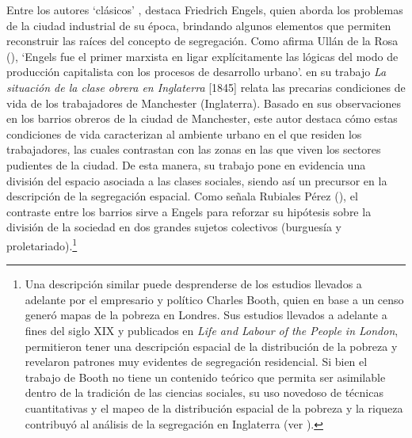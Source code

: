 \documentclass[
  spanish,
  a4paper,%
  chapterprefix=true,%
  DIV=calc,%
  twoside]{scrbook}%
\begin{document}
Entre los autores `clásicos' , destaca Friedrich Engels, quien aborda
los problemas de la ciudad industrial de su época, brindando algunos
elementos que permiten reconstruir las raíces del concepto de
segregación. Como afirma Ullán de la Rosa (), `Engels fue el
primer marxista en ligar explícitamente las lógicas del modo de
producción capitalista con los procesos de desarrollo urbano'. en su
trabajo \emph{La situación de la clase obrera en Inglaterra} {[}1845{]} relata
las precarias condiciones de vida de los trabajadores de Manchester
(Inglaterra). Basado en sus observaciones en los barrios obreros de la
ciudad de Manchester, este autor destaca cómo estas condiciones de vida
caracterizan al ambiente urbano en el que residen los trabajadores, las
cuales contrastan con las zonas en las que viven los sectores pudientes
de la ciudad. De esta manera, su trabajo pone en evidencia una división
del espacio asociada a las clases sociales, siendo así un precursor en
la descripción de la segregación espacial. Como señala
Rubiales Pérez (), el contraste entre los barrios sirve a Engels para
reforzar su hipótesis sobre la división de la sociedad en dos grandes
sujetos colectivos (burguesía y proletariado).\footnote{Una descripción similar puede
  desprenderse de los estudios llevados a adelante por el empresario y
  político Charles Booth, quien en base a un censo generó mapas de la
  pobreza en Londres. Sus estudios llevados a adelante a fines del
  siglo XIX y publicados en \emph{Life and Labour of the People in London},
  permitieron tener una descripción espacial de la distribución de la
  pobreza y revelaron patrones muy evidentes de segregación
  residencial. Si bien el trabajo de Booth no tiene un contenido
  teórico que permita ser asimilable dentro de la tradición de las
  ciencias sociales, su uso novedoso de técnicas cuantitativas y el
  mapeo de la distribución espacial de la pobreza y la riqueza
  contribuyó al análisis de la segregación en Inglaterra (ver ).}
\end{document}
